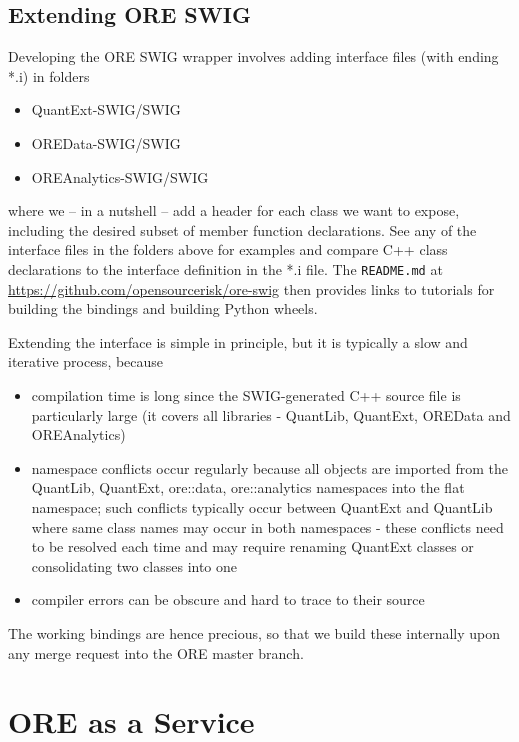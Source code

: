 \documentclass[12pt, a4paper]{report}
\begin{document}
\subsection*{Extending ORE SWIG}

Developing the ORE SWIG wrapper involves adding interface files (with ending *.i) in folders
\begin{itemize}
\item QuantExt-SWIG/SWIG
\item OREData-SWIG/SWIG
\item OREAnalytics-SWIG/SWIG
\end{itemize}
where we -- in a nutshell -- add a header for each class we want to expose, including the desired
subset of member function declarations. See any of the interface files in the folders above for examples
and compare C++ class declarations to the interface definition in the *.i file.
The {\tt README.md} at \url{https://github.com/opensourcerisk/ore-swig} then provides links to
tutorials for building the bindings and building Python wheels.

Extending the interface is simple in principle, but it is typically a slow and iterative process, because
\begin{itemize}
\item compilation time is long since the SWIG-generated C++ source file is particularly large (it covers all
  libraries - QuantLib, QuantExt, OREData and OREAnalytics)
\item namespace conflicts occur regularly because all objects are imported from the QuantLib, QuantExt, ore::data,
  ore::analytics namespaces into the flat namespace; such conflicts typically occur between QuantExt and QuantLib where
  same class names may occur in both namespaces - these conflicts need to be resolved each time and may require
  renaming QuantExt classes or consolidating two classes into one
\item compiler errors can be obscure and hard to trace to their source
\end{itemize}

The working bindings are hence precious, so that we build these internally upon any merge request into the ORE
master branch.

\section{ORE as a Service}
\end{document}
